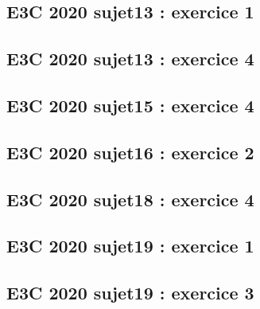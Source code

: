 \documentclass[lang=fr,edition=teacher,layout=sheet]{mxbook}
\begin{document}
\begingroup\endgroup
\par\bigskip
{}\subsection*{E3C 2020 sujet13 : exercice 1}
\begingroup\endgroup
\par\bigskip
{}\subsection*{E3C 2020 sujet13 : exercice 4}
\begingroup\endgroup
\par\bigskip
{}\subsection*{E3C 2020 sujet15 : exercice 4}
\begingroup\endgroup
\par\bigskip
{}\subsection*{E3C 2020 sujet16 : exercice 2}
\begingroup\endgroup
\par\bigskip
{}\subsection*{E3C 2020 sujet18 : exercice 4}
\begingroup\endgroup
\par\bigskip
{}\subsection*{E3C 2020 sujet19 : exercice 1}
\begingroup\endgroup
\par\bigskip
{}\subsection*{E3C 2020 sujet19 : exercice 3}
\end{document}
